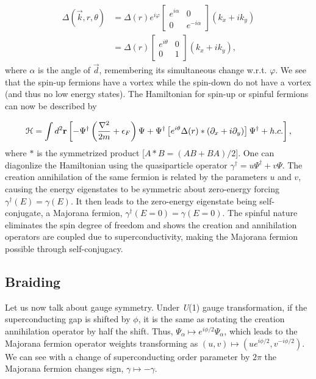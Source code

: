\begin{align}
  \Delta (\vec{k},r,\theta) &= \Delta(r) e^{i\varphi}
  \begin{bmatrix}
    e^{i\alpha} & 0 \\
    0 & e^{-i\alpha}
  \end{bmatrix}
  (k_x + i k_y) \nonumber \\
  &= \Delta(r)
  \begin{bmatrix}
    e^{i\theta} & 0 \\
    0 & 1
  \end{bmatrix}
  (k_x + i k_y),
\end{align}
where $\alpha$ is the angle of $\vec{d}$, remembering its simultaneous change w.r.t. $\varphi$.
We see that the spin-up fermions have a vortex while the spin-down do not have a vortex (and thus no low energy states).
The Hamiltonian for spin-up or spinful fermions can now be described by

\begin{equation}
  \mathcal{H} = \int d^2 \mathbf{r} \left[ -\Psi^{\dagger} \left( \dfrac{\nabla^2}{2m} + \epsilon_F \right) \Psi + \Psi^{\dagger} \left[ e^{i\theta} \Delta(r) * \left( \partial_x +i\partial_y \right) \right] \Psi^{\dagger} + h.c. \right],
\end{equation}
where $*$ is the symmetrized product
[$A*B = (AB + BA) / 2$].
One can diagonlize the Hamiltonian using the quasiparticle operator
$\gamma^{\dagger} = u\Psi^{\dagger} + v\Psi$.
The creation annihilation of the same fermion is related by the parameters $u$ and $v$, causing the energy eigenstates to be symmetric about zero-energy forcing
$\gamma^{\dagger}(E) = \gamma (E)$.
It then leads to the zero-energy eigenstate being self-conjugate, a Majorana fermion,
$\gamma^{\dagger}(E=0) = \gamma (E=0)$.
The spinful nature eliminates the spin degree of freedom and shows the creation and annihilation operators are coupled due to superconductivity, making the Majorana fermion possible through self-conjugacy.

\subsection{Braiding}
Let us now talk about gauge symmetry.
Under \textit{U}(1) gauge transformation, if the superconducting gap is shifted by $\phi$, it is the same as rotating the creation annihilation operator by half the shift.
Thus, $\Psi_{\alpha} \mapsto e^{i\phi/2} \Psi_{\alpha}$, which leads to the Majorana fermion operator weights transforming as $(u,v) \mapsto (ue^{i\phi/2}, v^{-i\phi/2})$.
We can see with a change of superconducting order parameter by $2\pi$ the Majorana fermion changes sign, $\gamma \mapsto -\gamma$.

